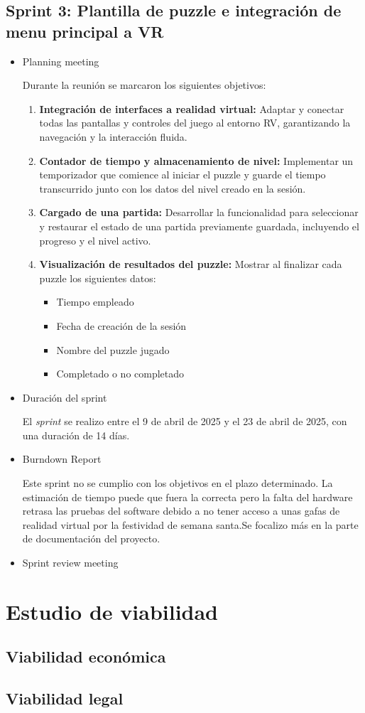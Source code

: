 \subsection{\textbf{Sprint 3: Plantilla de puzzle e integración de menu principal a VR } }
\begin{itemize}
    \item {Planning meeting}
    
Durante la reunión se marcaron los siguientes objetivos:
\begin{enumerate}
  \item \textbf{Integración de interfaces a realidad virtual:}  
    Adaptar y conectar todas las pantallas y controles del juego al entorno RV, garantizando la navegación y la interacción fluida.

  \item \textbf{Contador de tiempo y almacenamiento de nivel:}  
    Implementar un temporizador que comience al iniciar el puzzle y guarde el tiempo transcurrido junto con los datos del nivel creado en la sesión.

  \item \textbf{Cargado de una partida:}  
    Desarrollar la funcionalidad para seleccionar y restaurar el estado de una partida previamente guardada, incluyendo el progreso y el nivel activo.

  \item \textbf{Visualización de resultados del puzzle:}  
    Mostrar al finalizar cada puzzle los siguientes datos:  
    \begin{itemize}
      \item Tiempo empleado  
      \item Fecha de creación de la sesión  
      \item Nombre del puzzle jugado
      \item Completado o no completado
    \end{itemize}
\end{enumerate}
    \item {Duración del sprint}
    
El \textit{sprint } se realizo entre el 9 de abril de 2025 y el 23 de abril de 2025, con una duración de 14 días.
    \item {Burndown Report}
    
Este sprint no se cumplio con los objetivos en el plazo determinado. La estimación de tiempo puede que fuera la correcta pero la falta del hardware retrasa las pruebas del software debido a no tener acceso a unas gafas de realidad virtual por la festividad de semana santa.Se focalizo más en la parte de documentación del proyecto.

    \item {Sprint review meeting}

\end{itemize}
\section{Estudio de viabilidad}

\subsection{Viabilidad económica}

\subsection{Viabilidad legal}


